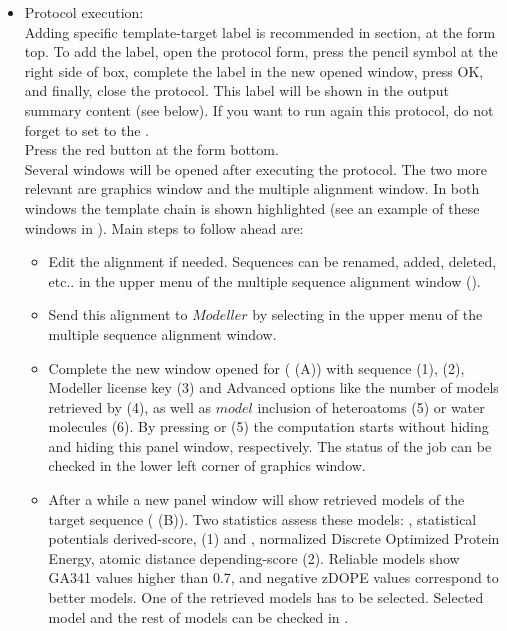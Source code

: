 \begin{itemize}
\begin{itemize}
  \end{itemize}
  \item Protocol execution:\\
  
  Adding specific template-target label is recommended in  section, at the form top. To add the label, open the protocol form, press the pencil symbol at the right side of  box, complete the label in the new opened window, press OK, and finally, close the protocol. This label will be shown in the output summary content (see below). If you want to run again this protocol, do not forget to set to  the .\\
  Press the  red button at the form bottom.\\
  
  Several \chimera windows will be opened after executing the protocol. The two more relevant are \chimera graphics window and the multiple alignment window. In both windows the template chain is shown highlighted (see an example of these windows in ). Main steps to follow ahead are:\\
  \begin{itemize}
   \item Edit the alignment if needed. Sequences can be renamed, added, deleted, etc.. in the upper menu of the multiple sequence alignment window ().\\
   \item Send this alignment to $Modeller$ by selecting  in the upper menu of the multiple sequence alignment window.\\ 
   \item Complete the new window opened for  ( (A)) with  sequence (1),  (2), Modeller license key (3) and Advanced options like the number of models retrieved by \modeller (4), as well as $model$ inclusion of heteroatoms (5) or water molecules (6). By pressing  or  (5) the computation starts without hiding and hiding this panel window, respectively. The status of the job can be checked in the lower left corner of \chimera graphics window.\\
   \item After a while a new panel window will show retrieved models of the target sequence ( (B)). Two statistics assess these models: , statistical potentials derived-score, (1) and , normalized Discrete Optimized Protein Energy, atomic distance depending-score (2). Reliable models show GA341 values higher than 0.7, and negative zDOPE values correspond to better models. One of the retrieved models has to be selected. Selected model and the rest of models can be checked in \chimera {}.\\

\end{itemize}
\end{itemize}
